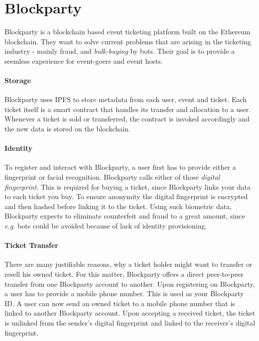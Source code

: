 
\section{Blockparty}

Blockparty \cite{blockparty-whitepaper} is a blockchain based event ticketing platform built on the Ethereum blockchain. They want to solve current problems that are arising in the ticketing industry - mainly fraud, and \textit{bulk-buying} by bots. Their goal is to provide a seemless experience for event-goers and event hosts.

\paragraph{Storage} Blockparty uses IPFS to store metadata from each user, event and ticket. Each ticket itself is a smart contract that handles its transfer and allocation to a user. Whenever a ticket is sold or transferred, the contract is invoked accordingly and the new data is stored on the blockchain.

\paragraph{Identity} To register and interact with Blockparty, a user first has to provide either a fingerprint or facial recognition. Blockparty calls either of those \textit{digital fingerprint}. This is required for buying a ticket, since Blockparty links your data to each ticket you buy. To ensure anonymity the digital fingerprint is encrypted and then hashed before linking it to the ticket. Using such biometric data, Blockparty expects to eliminate counterfeit and fraud to a great amount, since \textit{e.g.} bots could be avoided because of lack of identity provisioning.

\paragraph{Ticket Transfer} There are many justifiable reasons, why a ticket holder might want to transfer or resell his owned ticket. For this matter, Blockparty offers a direct peer-to-peer transfer from one Blockparty account to another. Upon registering on Blockparty, a user has to provide a mobile phone number. This is used as your Blockparty ID. A user can now send an owned ticket to a mobile phone number that is linked to another Blockparty account. Upon accepting a received ticket, the ticket is unlinked from the sender's digital fingerprint and linked to the receiver's digital fingerprint.

